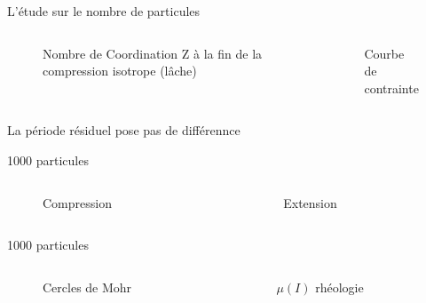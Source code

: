 \documentclass[10pt]{beamer}
\begin{document}
\begin{frame}{L'étude sur le nombre de particules}
    \begin{columns}
        \begin{column}{0.5\textwidth}
            \begin{figure}
                \centering
                \scalebox{0.5}{}
                \caption{Nombre de Coordination Z à la fin de la compression isotrope (lâche)}
            \end{figure}
        \end{column}
        \begin{column}{0.5\textwidth}
            \begin{figure}
                \centering
                \scalebox{0.5}{}
                \caption{Courbe de contrainte}
            \end{figure}
        \end{column}
    \end{columns}
    La période résiduel pose pas de différennce
\end{frame}

\begin{frame}{1000 particules}
    \begin{columns}
        \begin{column}{0.5\textwidth}
            \begin{figure}
                \centering
                \scalebox{0.5}{}
                \caption{Compression}
            \end{figure}
        \end{column}
        \begin{column}{0.5\textwidth}
            \begin{figure}
                \centering
                \scalebox{0.5}{}
                \caption{Extension}
            \end{figure}
        \end{column}
    \end{columns}
\end{frame}

\begin{frame}{1000 particules}
    \begin{columns}
        \begin{column}{0.5\textwidth}
            \begin{figure}
                \centering
                \scalebox{0.4}{}
                \caption{Cercles de Mohr}
            \end{figure}
        \end{column}
        \begin{column}{0.5\textwidth}
            \begin{figure}
                \centering
                \scalebox{0.5}{}
                \caption{$\mu(I)$ rhéologie}
            \end{figure}
        \end{column}
    \end{columns}
\end{frame}
\end{document}
